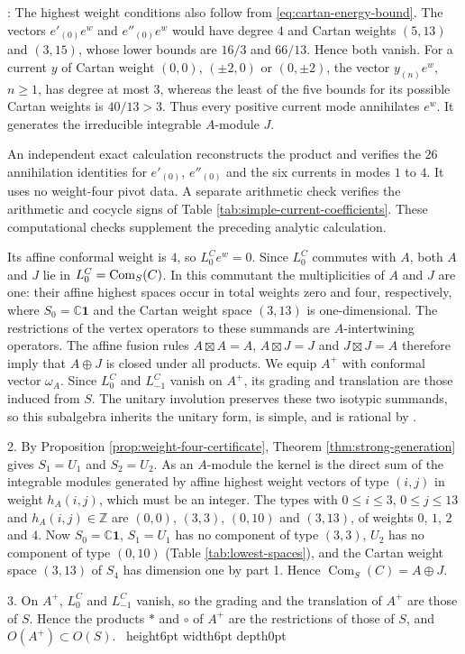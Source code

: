 \documentclass[leqno]{article}
\newcommand{\Cbb}{\ensuremath{\mathbb{C}}}
\newcommand{\Z}{\ensuremath{\mathbb{Z}}}
\renewcommand{\leq}{\ensuremath{\leqslant}}
\renewcommand{\geq}{\ensuremath{\geqslant}}
\newcommand{\qed}{\hfill \vrule height6pt  width6pt depth0pt}
\let\ker\relax
\DeclareMathOperator{\ker}{Ker}
\newenvironment{proof}[1][]{\noindent {\it Proof #1} : }{\hbox{~}\qed
\smallskip
}
\numberwithin{equation}{section}
\begin{document}
\begin{proof}
The highest weight conditions also follow from \eqref{eq:cartan-energy-bound}. The vectors $e'_{(0)}e^w$ and $e''_{(0)}e^w$ would have degree $4$ and Cartan weights $(5,13)$ and $(3,15)$, whose lower bounds are $16/3$ and $66/13$. Hence both vanish. For a current $y$ of Cartan weight $(0,0)$, $(\pm2,0)$ or $(0,\pm2)$, the vector $y_{(n)}e^w$, $n \geq 1$, has degree at most $3$, whereas the least of the five bounds for its possible Cartan weights is $40/13 > 3$. Thus every positive current mode annihilates $e^w$. It generates the irreducible integrable $A$-module $J$.

An independent exact calculation reconstructs the product and verifies the $26$ annihilation identities for $e'_{(0)}$, $e''_{(0)}$ and the six currents in modes $1$ to $4$. It uses no weight-four pivot data. A separate arithmetic check verifies the arithmetic and cocycle signs of Table \ref{tab:simple-current-coefficients}. These computational checks supplement the preceding analytic calculation.

Its affine conformal weight is $4$, so $L^C_0e^w = 0$. Since $L^C_0$ commutes with $A$, both $A$ and $J$ lie in $\ker L^C_0 = \operatorname{Com}_S(C)$. In this commutant the multiplicities of $A$ and $J$ are one: their affine highest spaces occur in total weights zero and four, respectively, where $S_0 = \Cbb\mathbf 1$ and the Cartan weight space $(3,13)$ is one-dimensional. The restrictions of the vertex operators to these summands are $A$-intertwining operators. The affine fusion rules $A \boxtimes A = A$, $A \boxtimes J = J$ and $J \boxtimes J = A$ therefore imply that $A \oplus J$ is closed under all products. We equip $A^+$ with conformal vector $\omega_A$. Since $L^C_0$ and $L^C_{-1}$ vanish on $A^+$, its grading and translation are those induced from $S$. The unitary involution preserves these two isotypic summands, so this subalgebra inherits the unitary form, is simple, and is rational by \cite[Theorem 4.5]{DLM96}.

2. By Proposition \ref{prop:weight-four-certificate}, Theorem \ref{thm:strong-generation} gives $S_1 = U_1$ and $S_2 = U_2$. As an $A$-module the kernel is the direct sum of the integrable modules generated by affine highest weight vectors of type $(i,j)$ in weight $h_A(i,j)$, which must be an integer. The types with $0 \leq i \leq 3$, $0 \leq j \leq 13$ and $h_A(i,j) \in \Z$ are $(0,0)$, $(3,3)$, $(0,10)$ and $(3,13)$, of weights $0$, $1$, $2$ and $4$. Now $S_0 = \Cbb\mathbf 1$, $S_1 = U_1$ has no component of type $(3,3)$, $U_2$ has no component of type $(0,10)$ (Table \ref{tab:lowest-spaces}), and the Cartan weight space $(3,13)$ of $S_4$ has dimension one by part 1. Hence $\operatorname{Com}_S(C) = A \oplus J$.

3. On $A^+$, $L^C_0$ and $L^C_{-1}$ vanish, so the grading and the translation of $A^+$ are those of $S$. Hence the products $*$ and $\circ$ of $A^+$ are the restrictions of those of $S$, and $O(A^+) \subset O(S)$.
\end{proof}
\end{document}
